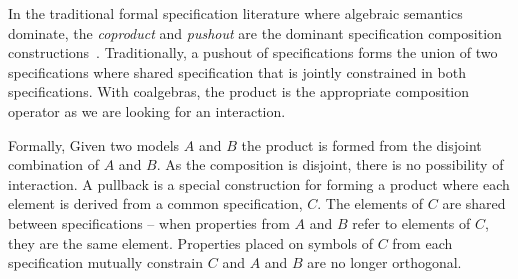 \documentclass[12pt]{article}
\begin{document}
In the traditional formal specification literature where algebraic
semantics dominate, the \emph{coproduct} and \emph{pushout} are the
dominant specification composition
constructions~\cite{Ehrig:85:Fundamentals-of,Smith:93:Constructing-Sp,Smith:90:KIDS:-A-Semiaut}.
Traditionally, a pushout of specifications forms the union of two
specifications where shared specification that is jointly constrained
in both specifications.  With coalgebras, the product is the
appropriate composition operator as we are looking for an interaction.

Formally, Given two models $A$ and $B$ the product is formed from the
disjoint combination of $A$ and $B$. As the composition is disjoint,
there is no possibility of interaction.  A pullback is a special
construction for forming a product where each element is derived from
a common specification, $C$.  The elements of $C$ are shared between
specifications -- when properties from $A$ and $B$ refer to
elements of $C$, they are the same element.  Properties placed on
symbols of $C$ from each specification mutually constrain $C$ and $A$
and $B$ are no longer orthogonal.
\end{document}
